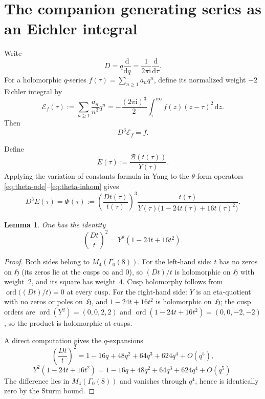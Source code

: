 \documentclass[11pt]{amsart}
\numberwithin{equation}{section}
\theoremstyle{plain}
\newtheorem{lemma}[theorem]{Lemma}
\theoremstyle{definition}
\theoremstyle{remark}
\newcommand{\Hh}{\mathfrak{H}}
\newcommand{\dd}{\mathrm{d}}
\newcommand{\ii}{\mathrm{i}}
\newcommand{\Dop}{D}
\newcommand{\thet}{\theta}
\DeclareMathOperator{\ord}{ord}
\begin{document}
\section{The companion generating series as an Eichler integral}\label{sec:eichler}

Write
\[
\Dop=q\frac{\dd}{\dd q}=\frac{1}{2\pi\ii}\frac{\dd}{\dd\tau}.
\]
For a holomorphic $q$-series $f(\tau)=\sum_{n\ge 1}a_n q^n$, define its normalized weight $-2$ Eichler integral by
\begin{equation}\label{eq:eichler-def}
\mathcal E_f(\tau):=\sum_{n\ge 1}\frac{a_n}{n^3}q^n
=-\frac{(2\pi\ii)^3}{2}\int_{\tau}^{\ii\infty}f(z)(z-\tau)^2\,\dd z.
\end{equation}
Then
\begin{equation}\label{eq:eichler-D3}
\Dop^3\mathcal E_f=f.
\end{equation}

Define
\begin{equation}\label{eq:E-def}
E(\tau):=\frac{\mathcal B(t(\tau))}{Y(\tau)}.
\end{equation}
Applying the variation-of-constants formula in Yang \cite[Lemmas~1--2, and the example following Lemma~2]{Yang} to the $\thet$-form operators \eqref{eq:theta-ode}--\eqref{eq:theta-inhom} gives
\begin{equation}\label{eq:Phi-def}
\Dop^3E(\tau)=\Phi(\tau):=\left(\frac{\Dop t(\tau)}{t(\tau)}\right)^3
\frac{t(\tau)}{Y(\tau)\bigl(1-24t(\tau)+16t(\tau)^2\bigr)}.
\end{equation}

\begin{lemma}\label{lem:wronskian}
One has the identity
\begin{equation}\label{eq:wronskian}
\left(\frac{\Dop t}{t}\right)^2=Y^2(1-24t+16t^2).
\end{equation}
\end{lemma}

\begin{proof}
Both sides belong to $M_4(\Gamma_0(8))$. For the left-hand side: $t$ has no zeros on $\Hh$ (its zeros lie at the cusps $\infty$ and $0$), so $(\Dop t)/t$ is holomorphic on $\Hh$ with weight~$2$, and its square has weight~$4$. Cusp holomorphy follows from $\ord\bigl((\Dop t)/t\bigr)=0$ at every cusp. For the right-hand side: $Y$ is an eta-quotient with no zeros or poles on~$\Hh$, and $1-24t+16t^2$ is holomorphic on~$\Hh$; the cusp orders are $\ord(Y^2)=(0,0,2,2)$ and $\ord(1-24t+16t^2)=(0,0,-2,-2)$, so the product is holomorphic at cusps.

A direct computation gives the $q$-expansions
\[
\left(\frac{\Dop t}{t}\right)^2=1-16q+48q^2+64q^3+624q^4+O(q^5),
\]
\[
Y^2(1-24t+16t^2)=1-16q+48q^2+64q^3+624q^4+O(q^5).
\]
The difference lies in $M_4(\Gamma_0(8))$ and vanishes through $q^4$, hence is identically zero by the Sturm bound.
\end{proof}
\end{document}
